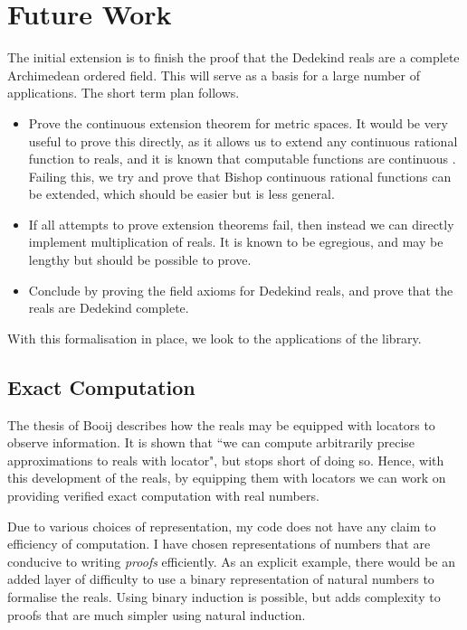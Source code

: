 \documentclass[ProjectReport]{subfiles}
\begin{document}
\section{Future Work}

The initial extension is to finish the proof that the Dedekind reals are a complete Archimedean ordered field. This will serve as a basis for a large number of applications. The short term plan follows.

\begin{itemize}
    \item Prove the continuous extension theorem for metric spaces. It would be very useful to prove this directly, as it allows us to extend any continuous rational function to reals, and it is known that computable functions are continuous \cite{81018}. Failing this, we try and prove that Bishop continuous rational functions can be extended, which should be easier but is less general.
    \item If all attempts to prove extension theorems fail, then instead we can directly implement multiplication of reals. It is known to be egregious, and may be lengthy but should be possible to prove. 
    \item Conclude by proving the field axioms for Dedekind reals, and prove that the reals are Dedekind complete. 
\end{itemize}

With this formalisation in place, we look to the applications of the library.

\subsection{Exact Computation}

The thesis of Booij \cite{booij_2021} describes how the reals may be equipped with locators to observe information. It is shown that ``we can compute arbitrarily precise approximations to reals with locator", but stops short of doing so. Hence, with this development of the reals, by equipping them with locators we can work on providing verified exact computation with real numbers.

Due to various choices of representation, my code does not have any claim to efficiency of computation. I have chosen representations of numbers that are conducive to writing \textit{proofs} efficiently. As an explicit example, there would be an added layer of difficulty to use a binary representation of natural numbers to formalise the reals. Using binary induction is possible, but adds complexity to proofs that are much simpler using natural induction. 
\end{document}
